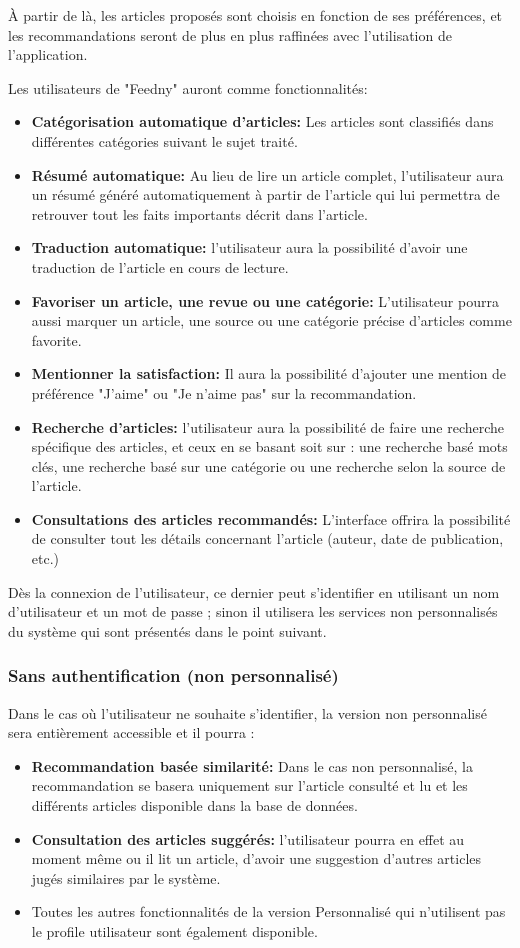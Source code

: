 À partir de là, les articles proposés sont choisis en fonction de ses préférences, et les recommandations seront de plus en plus raffinées avec l'utilisation de l'application.

Les utilisateurs de "Feedny" auront comme fonctionnalités:  
\begin{itemize}
	\item \textbf{Catégorisation automatique d'articles:}
	Les articles sont classifiés dans différentes catégories suivant le sujet traité.
	\item \textbf{Résumé automatique:}
	Au lieu de lire un article complet, l'utilisateur aura un résumé généré automatiquement à partir de l'article qui lui permettra de retrouver tout les faits importants décrit dans l'article.
	\item \textbf{Traduction automatique:}
	l'utilisateur aura la possibilité d'avoir une traduction de l'article en cours de lecture.
    \item \textbf{Favoriser un article, une revue ou une catégorie:}
    L'utilisateur pourra aussi marquer un article, une source ou une catégorie précise d'articles comme favorite.
    \item \textbf{Mentionner la satisfaction:}
    Il aura la possibilité d'ajouter une mention de préférence "J'aime" ou "Je n'aime pas" sur la recommandation.
    \item \textbf{Recherche d'articles:}
    l'utilisateur aura la possibilité de faire une recherche spécifique des articles, et ceux en se basant soit sur : une recherche basé mots clés, une recherche basé sur une catégorie ou une recherche selon la source de l'article. 
    \item \textbf{Consultations des articles recommandés:}
    L'interface offrira la possibilité de consulter tout les détails concernant l'article (auteur, date de publication, etc.) 
\end{itemize}
Dès la connexion de l'utilisateur, ce dernier peut s'identifier en utilisant un nom d'utilisateur et un mot de passe ; sinon il utilisera les services non personnalisés du système qui sont présentés dans le point suivant.

\subsubsection{Sans authentification (non personnalisé)}
Dans le cas où l'utilisateur ne souhaite s'identifier, la version non personnalisé sera entièrement accessible et il pourra :
\begin{itemize}
	\item \textbf{Recommandation basée similarité:}
	Dans le cas non personnalisé, la recommandation se basera uniquement sur l'article consulté et lu et les différents articles disponible dans la base de données.	
	\item \textbf{Consultation des articles suggérés:}
	l'utilisateur pourra en effet au moment même ou il lit un article, d'avoir une suggestion d'autres articles jugés similaires par le système.
	\item Toutes les autres fonctionnalités de la version Personnalisé qui n'utilisent pas le profile utilisateur sont également disponible.
\end{itemize}

